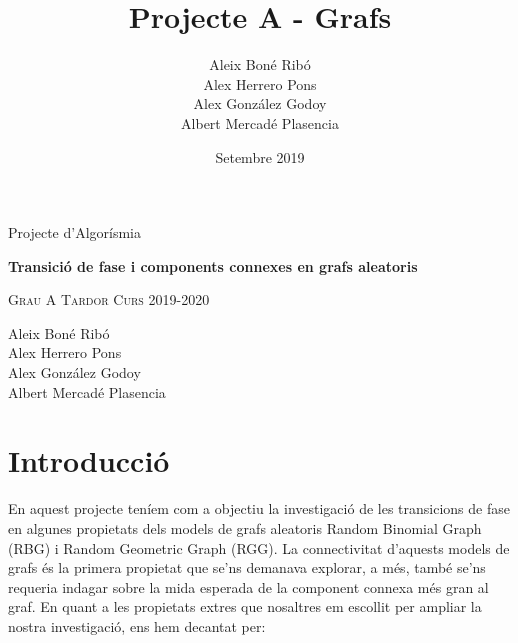 



%

\title{Projecte A - Grafs}
\author{
Aleix Boné Ribó\\
Alex Herrero Pons\\
Alex González Godoy\\
Albert Mercadé Plasencia\\
}
\date{Setembre 2019}



\thispagestyle{empty}
\clearpage
\setcounter{page}{-1}

\begin{titlepage}
{
    \centering
    \null
    \vfill
    {\Large Projecte d'Algorísmia\par}
    \vspace{2em}
    {\Huge \bfseries 
    Transició de fase i components connexes en grafs aleatoris
    \par}
    \vspace{2em}
    {\large \scshape 
    Grau A \qquad Tardor Curs 2019-2020
    \par}
    \vfill
\begin{center}
    
\end{center}
    \vspace{3cm}

    \vfill
    {\raggedleft \large
Aleix Boné Ribó\\
Alex Herrero Pons\\
Alex González Godoy\\
Albert Mercadé Plasencia\\
        \par}
}
\end{titlepage}

\pagebreak
{} 

\tableofcontents
\pagebreak
{} 

\section{Introducció}
En aquest projecte teníem com a objectiu la investigació de les transicions de fase en algunes propietats dels models de grafs aleatoris Random Binomial Graph (RBG) i Random Geometric Graph (RGG). La connectivitat d'aquests models de grafs és la primera propietat que se'ns demanava explorar, a més, també se'ns requeria indagar sobre la mida esperada de la component connexa més gran al graf. En quant a les propietats extres que nosaltres em escollit per ampliar la nostra investigació, ens hem decantat per:

